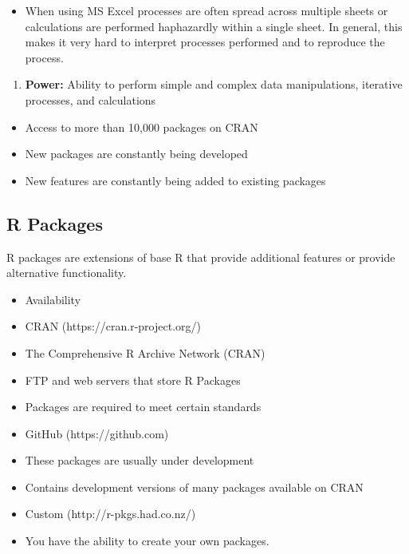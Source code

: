 \documentclass[
  letterpaper,
  DIV=11,
  numbers=noendperiod]{scrreprt}
\providecommand{\tightlist}{%
  \setlength{\itemsep}{0pt}\setlength{\parskip}{0pt}}\usepackage{longtable,booktabs,array}
\begin{document}
\begin{itemize}
\tightlist
\item
  When using MS Excel processes are often spread across multiple sheets
  or calculations are performed haphazardly within a single sheet. In
  general, this makes it very hard to interpret processes performed and
  to reproduce the process.
\end{itemize}

\begin{enumerate}
\def\labelenumi{\arabic{enumi}.}
\setcounter{enumi}{1}
\tightlist
\item
  \textbf{Power:} Ability to perform simple and complex data
  manipulations, iterative processes, and calculations
\end{enumerate}

\begin{itemize}
\item
  Access to more than 10,000 packages on CRAN
\item
  New packages are constantly being developed
\item
  New features are constantly being added to existing packages
\end{itemize}

\hypertarget{r-packages}{%
\subsection{R Packages}\label{r-packages}}

R packages are extensions of base R that provide additional features or
provide alternative functionality.

\begin{itemize}
\item
  Availability
\item
  CRAN (https://cran.r-project.org/)
\item
  The Comprehensive R Archive Network (CRAN)
\item
  FTP and web servers that store R Packages
\item
  Packages are required to meet certain standards
\item
  GitHub (https://github.com)
\item
  These packages are usually under development
\item
  Contains development versions of many packages available on CRAN
\item
  Custom (http://r-pkgs.had.co.nz/)
\item
  You have the ability to create your own packages.
\end{itemize}
\end{document}
